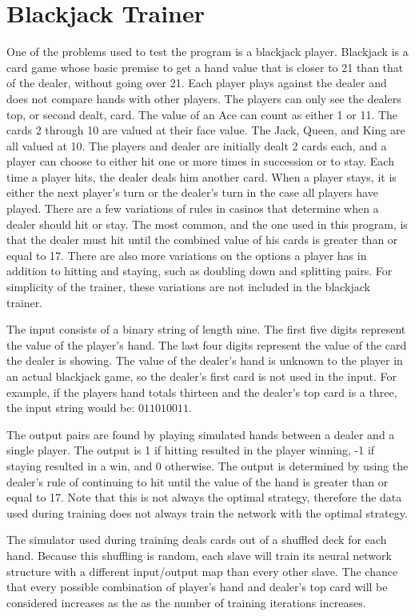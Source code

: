 \chapter[Blackjack Trainer]{Blackjack Trainer}
One of the problems used to test the program is a blackjack player. 
Blackjack is a card game whose basic premise to get a hand value that is closer to 21 than that of the dealer, without going over 21. 
Each player plays against the dealer and does not compare hands with other players. 
The players can only see the dealers top, or second dealt, card. 
The value of an Ace can count as either 1 or 11. 
The cards 2 through 10 are valued at their face value. 
The Jack, Queen, and King are all valued at 10. 
The players and dealer are initially dealt 2 cards each, and a player can choose to either hit one or more times in succession or to stay. 
Each time a player hits, the dealer deals him another card. 
When a player stays, it is either the next player's turn or the dealer's turn in the case all players have played. 
There are a few variations of rules in casinos that determine when a dealer should hit or stay. 
The most common, and the one used in this program, is that the dealer must hit until the combined value of his cards is greater than or equal to 17. 
There are also more variations on the options a player has in addition to hitting and staying, such as doubling down and splitting pairs. 
For simplicity of the trainer, these variations are not included in the blackjack trainer.

The input consists of a binary string of length nine.
The first five digits represent the value of the player's hand.
The last four digits represent the value of the card the dealer is
showing.
The value of the dealer's hand is unknown to the player in an actual blackjack game, so the dealer's first card is not used in the input. 
For example, if the players hand totals thirteen and the dealer's top
card is a three, the input string would be:  $011010011$.

The output pairs are found by playing simulated hands between a dealer and a single player. 
The output is 1 if hitting resulted in the player winning, -1 if
staying resulted in a win, and 0 otherwise.
The output is determined by using the dealer's rule of continuing to
hit until the value of the hand is greater than or equal to 17.
Note that this is not always the optimal strategy, therefore the
data used during training does not always train the network with the
optimal strategy.

The simulator used during training deals cards out of a shuffled deck
for each hand.
Because this shuffling is random, each slave will train its neural network structure with a different input/output map
than every other slave.
The chance that every possible combination of player's hand and dealer's top card
will be considered increases as the as the number
of training iterations increases. 

